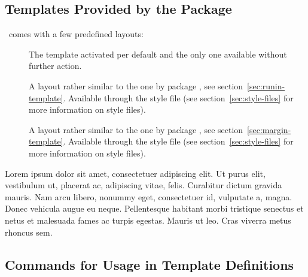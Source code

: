 \documentclass{xsim-manual}
\begin{document}
\subsection{Templates Provided by the Package}
\xsim\ comes with a few predefined layouts:
\begin{description}
  \item[] The template activated per default and the only one
    available without further action.
  \item[] A layout rather similar to the one by package
    , see section~\vref{sec:runin-template}.  Available through
    the style file  (see section~\vref{sec:style-files} for more
    information on style files).
  \item[] A layout rather similar to the one by package
    , see section~\ref{sec:margin-template}.  Available through
    the style file  (see section~\vref{sec:style-files} for more
    information on style files).
\end{description}

\begin{exercise}[subtitle=The Subtitle,points=2.5,ID=showlayout]
  Lorem ipsum dolor sit amet, consectetuer adipiscing elit. Ut purus elit,
  vestibulum ut, placerat ac, adipiscing vitae, felis. Curabitur dictum
  gravida mauris. Nam arcu libero, nonummy eget, consectetuer id, vulputate a,
  magna. Donec vehicula augue eu neque. Pellentesque habitant morbi tristique
  senectus et netus et malesuada fames ac turpis egestas. Mauris ut leo. Cras
  viverra metus rhoncus sem.
\end{exercise}

\listlayouts

\subsection{Commands for Usage in Template Definitions}
\end{document}
